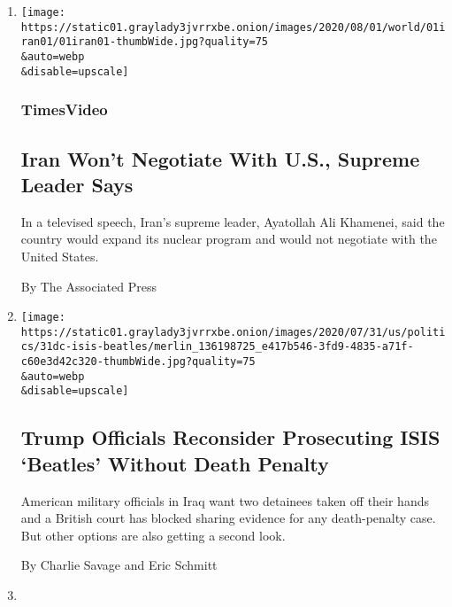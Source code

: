\begin{enumerate}
\def\labelenumi{\arabic{enumi}.}
\item
  \href{/video/world/middleeast/100000007268443/iran-united-states-nuclear-program-negotiation.html}{}

  \texttt{[image: https://static01.graylady3jvrrxbe.onion/images/2020/08/01/world/01iran01/01iran01-thumbWide.jpg?quality=75\\\&auto=webp\\\&disable=upscale]}

  \hypertarget{timesvideo}{%
  \subsubsection{TimesVideo}\label{timesvideo}}

  \hypertarget{iran-wont-negotiate-with-us-supreme-leader-says}{%
  \subsection{Iran Won't Negotiate With U.S., Supreme Leader
  Says}\label{iran-wont-negotiate-with-us-supreme-leader-says}}

  In a televised speech, Iran's supreme leader, Ayatollah Ali Khamenei,
  said the country would expand its nuclear program and would not
  negotiate with the United States.

  By The Associated Press
\item
  \href{/2020/07/31/world/middleeast/isis-beatles-hostages.html}{}

  \texttt{[image: https://static01.graylady3jvrrxbe.onion/images/2020/07/31/us/politics/31dc-isis-beatles/merlin\_136198725\_e417b546-3fd9-4835-a71f-c60e3d42c320-thumbWide.jpg?quality=75\\\&auto=webp\\\&disable=upscale]}

  \hypertarget{trump-officials-reconsider-prosecuting-isis-beatles-without-death-penalty}{%
  \subsection{Trump Officials Reconsider Prosecuting ISIS `Beatles'
  Without Death
  Penalty}\label{trump-officials-reconsider-prosecuting-isis-beatles-without-death-penalty}}

  American military officials in Iraq want two detainees taken off their
  hands and a British court has blocked sharing evidence for any
  death-penalty case. But other options are also getting a second look.

  By Charlie Savage and Eric Schmitt
\item
  \href{/2020/07/31/world/middleeast/Middle-East-heat-wave.html}{}


\end{enumerate}
